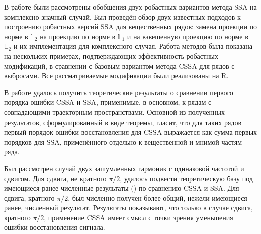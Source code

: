 \documentclass[specialist,
               substylefile = spbu.rtx,
               subf,href,colorlinks=true, 12pt]{disser}
\begin{document}


\conclusion
В работе были рассмотрены обобщения двух робастных вариантов метода SSA на комплексно-значный случай.
Был проведён обзор двух известных подходов к построению робастных версий SSA для вещественных рядов: замена проекции по норме в $\mathbb{L}_2$ на проекцию по норме в $\mathbb{L}_1$ и на взвешенную проекцию по норме в $\mathbb{L}_2$ и их имплементация для комплексного случая.
Работа методов была показана на нескольких примерах, подтверждающих эффективность робастных модификаций, в сравнении с базовым вариантом метода CSSA для рядов с выбросами. Все рассматриваемые модификации были реализованы на R.

В работе удалось получить теоретические результаты о сравнении первого порядка ошибки CSSA и SSA, применимые, в основном, к рядам с совпадающими траекторным пространствами. Основной из полученных результатов, сформулированный в виде теоремы, гласит, что для таких рядов первый порядок ошибки восстановления для CSSA выражается как сумма первых порядков для SSA, применённого отдельно к вещественной и мнимой частям ряда.

Был рассмотрен случай двух зашумленных гармоник с одинаковой частотой и сдвигом. Для сдвига, не кратного $\pi/2$, удалось подвести теоретическую базу под имеющиеся ранее численные результаты (\cite{Golyandina.etal2013}) по сравнению CSSA и SSA. Для сдвига, кратного $\pi/2$, был численно получен более общий, нежели имеющиеся ранее, численный результат.
Результаты показывают, что только в случае сдвига, кратного $\pi/2$, применение CSSA имеет смысл с точки зрения уменьшения ошибки восстановления сигнала.
\end{document}
